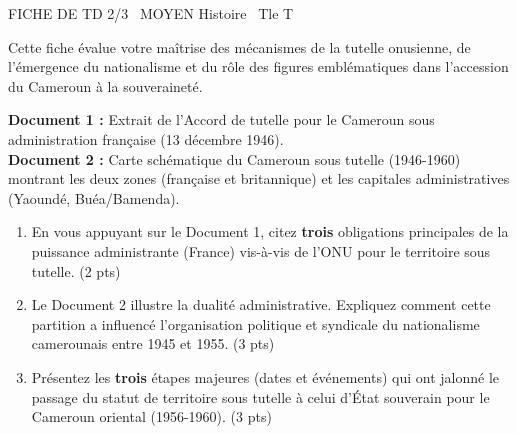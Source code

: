 \documentclass[11pt]{article}
\begin{document}
\begin{tcolorbox}[enhanced,colback=popink,colframe=popink,arc=10pt,boxrule=0pt,left=12pt,right=12pt,top=9pt,bottom=9pt]
{\color{white}\popxbold\small FICHE DE TD 2/3 \textbullet\ MOYEN \hfill Histoire \textbullet\ Tle T\par}
\end{tcolorbox}
\vspace{4pt}
Cette fiche évalue votre maîtrise des mécanismes de la tutelle onusienne, de l'émergence du nationalisme et du rôle des figures emblématiques dans l'accession du Cameroun à la souveraineté.

\begin{exercice}
\textbf{Document 1 :} Extrait de l'Accord de tutelle pour le Cameroun sous administration française (13 décembre 1946).\\
\textbf{Document 2 :} Carte schématique du Cameroun sous tutelle (1946-1960) montrant les deux zones (française et britannique) et les capitales administratives (Yaoundé, Buéa/Bamenda).

\begin{enumerate}
    \item En vous appuyant sur le Document 1, citez \textbf{trois} obligations principales de la puissance administrante (France) vis-à-vis de l'ONU pour le territoire sous tutelle. (2 pts)
    \item Le Document 2 illustre la dualité administrative. Expliquez comment cette partition a influencé l'organisation politique et syndicale du nationalisme camerounais entre 1945 et 1955. (3 pts)
    \item Présentez les \textbf{trois} étapes majeures (dates et événements) qui ont jalonné le passage du statut de territoire sous tutelle à celui d'État souverain pour le Cameroun oriental (1956-1960). (3 pts)
\end{enumerate}
\end{exercice}
\end{document}
